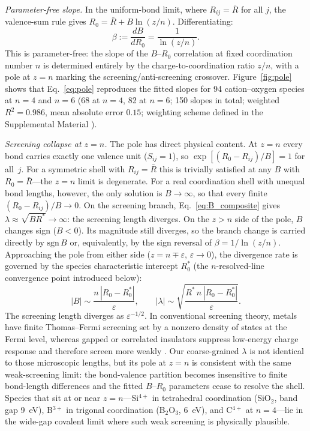 \documentclass[aps,prl,twocolumn,10pt,superscriptaddress,floatfix]{revtex4-2}
\begin{document}
\emph{Parameter-free slope.} In the uniform-bond limit, where
$R_{ij}=\bar R$ for all $j$, the valence-sum rule gives
$R_0=\bar R+B\ln(z/n)$.  Differentiating:
\begin{equation}\label{eq:pole}
\beta := \frac{dB}{dR_0} = \frac{1}{\ln(z/n)}.
\end{equation}
This is parameter-free: the slope of the $B$--$R_0$ correlation at fixed
coordination number $n$ is determined entirely by the charge-to-coordination
ratio $z/n$, with a pole at $z=n$ marking the screening/anti-screening crossover.
Figure~\ref{fig:pole} shows that Eq.~\eqref{eq:pole} reproduces the
fitted slopes for 94 cation--oxygen species at $n=4$ and $n=6$ (68 at
$n=4$, 82 at $n=6$; 150 slopes in total; weighted $R^2=0.986$, mean
absolute error $0.15$; weighting scheme defined in the Supplemental
Material \cite{suppmat}).

\emph{Screening collapse at $z=n$.} The pole has direct physical
content.  At $z=n$ every bond carries exactly one valence unit
($S_{ij}=1$), so $\exp[(R_0-R_{ij})/B]=1$ for all~$j$.  For a
symmetric shell with $R_{ij}=\bar R$ this is trivially satisfied at any
$B$ with $R_0=\bar R$---the $z=n$ limit is degenerate.  For a real
coordination shell with unequal bond lengths, however, the only solution
is $B\to\infty$, so that every finite $(R_0-R_{ij})/B\to 0$.  On the
screening branch, Eq.~\eqref{eq:B_composite} gives
$\lambda\approx\sqrt{BR^*}\to\infty$: the screening length diverges.
On the $z>n$ side of the pole, $B$ changes sign ($B<0$).  Its magnitude
still diverges, so the branch change is carried directly by $\mathrm{sgn}\,B$
or, equivalently, by the sign reversal of $\beta=1/\ln(z/n)$.  Approaching the pole from either
side ($z=n\mp\varepsilon$, $\varepsilon\to 0$), the divergence rate is
governed by the species characteristic intercept $R_0^*$ (the
$n$-resolved-line convergence point introduced below):
\begin{equation*}
|B| \sim \frac{n\,|R_0-R_0^*|}{\varepsilon},
\qquad
|\lambda| \sim \sqrt{\frac{R^*\,n\,|R_0-R_0^*|}{\varepsilon}}.
\end{equation*}
The screening length diverges as $\varepsilon^{-1/2}$.  In conventional
screening theory, metals have finite Thomas--Fermi screening set by a
nonzero density of states at the Fermi level, whereas gapped or
correlated insulators suppress low-energy charge response and therefore
screen more weakly \cite{Thomas1927,Fermi1928,Debye1923,AshcroftMermin1976}.
Our coarse-grained $\lambda$ is not identical to those microscopic
lengths, but its pole at $z=n$ is consistent with the same weak-screening
limit: the bond-valence partition becomes insensitive to finite
bond-length differences and the fitted $B$--$R_0$ parameters cease to
resolve the shell.  Species that sit at or near $z=n$---Si$^{4+}$ in tetrahedral
coordination (SiO$_2$, band gap 9~eV), B$^{3+}$ in trigonal
coordination (B$_2$O$_3$, 6~eV), and C$^{4+}$ at $n=4$---lie in the
wide-gap covalent limit where such weak screening is physically
plausible.
\end{document}
